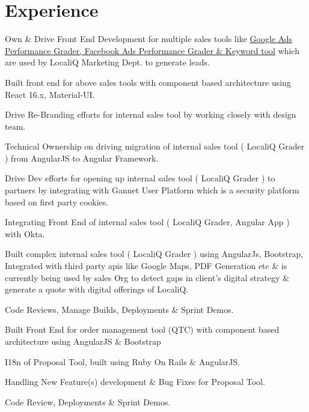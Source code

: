 \documentclass[]{my-resume-openfont}
\begin{document}
\hfill
\begin{minipage}[t]{0.66\textwidth}


\section{Experience}

\vspace{\topsep} %
\begin{tightemize}
\item{Own \& Drive Front End Development for multiple sales tools like \href{https://www.wordstream.com/wordstream-graders}{Google Ads Performance Grader, Facebook Ads Performance Grader \& Keyword tool} which are used by LocaliQ Marketing Dept. to generate leads.}
\item{Built front end for above sales tools with component based architecture using React 16.x, Material-UI.}
\item{Drive Re-Branding efforts for internal sales tool by working closely with design team.}
\item{Technical Ownership on driving migration of internal sales tool ( LocaliQ Grader ) from AngularJS to Angular Framework.}
\item{Drive Dev efforts for opening up internal sales tool ( LocaliQ Grader ) to partners by integrating with Gannet User Platform which is a security platform based on first party cookies.}
\item{Integrating Front End of internal sales tool ( LocaliQ Grader, Angular App ) with Okta.}
\item{Built complex internal sales tool ( LocaliQ Grader ) using AngularJs, Bootstrap, Integrated with third party apis like Google Maps, PDF Generation etc \& is currently being used by sales Org to detect gaps in client's digital strategy \& generate a quote with digital offerings of LocaliQ.}
\item{Code Reviews, Manage Builds, Deployments \& Sprint Demos.}
\end{tightemize}
\sectionsep

\begin{tightemize}
\item{Built Front End for order management tool (QTC) with component based architecture using AngularJS \& Bootstrap}
\item{I18n of Proposal Tool, built using Ruby On Rails \& AngularJS.}
\item{Handling New Feature(s) development \& Bug Fixes for Proposal Tool.}
\item{Code Review, Deployments \& Sprint Demos.}
\end{tightemize}
\sectionsep


\end{minipage}
\end{document}
